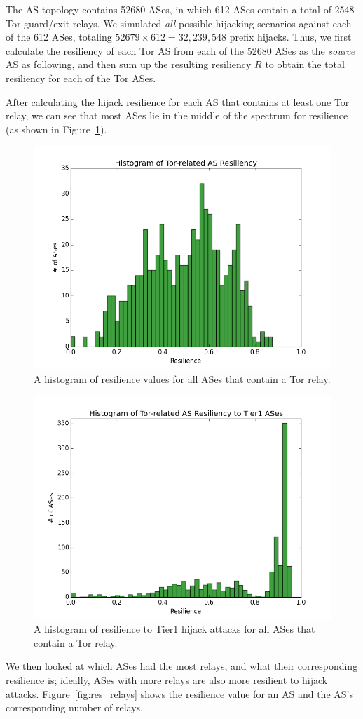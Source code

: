 The AS topology contains 52680 ASes, in which 612 ASes contain a total of 2548 Tor guard/exit relays. We simulated \emph{all} possible hijacking scenarios against each of the 612 ASes, totaling $52679 \times 612 = 32,239,548$ prefix hijacks. Thus, we first calculate the resiliency of each Tor AS from each of the 52680 ASes as the \emph{source} AS as following, and then sum up the resulting resiliency $R$ to obtain the total resiliency for each of the Tor ASes. 

After calculating the hijack resilience for each AS that contains at least one Tor relay, we can see that most ASes lie in the middle of the spectrum for resilience (as shown in Figure~\ref{fig:resilience_histogram}).

\begin{figure}
\centering
\includegraphics[width=.4\textwidth]{resilience_histogram}
\caption{A histogram of resilience values for all ASes that contain a Tor relay.}
\label{fig:resilience_histogram}
\end{figure}

\begin{figure}
\centering
\includegraphics[width=.4\textwidth]{hijack_tier1}
\caption{A histogram of resilience to Tier1 hijack attacks for all ASes that contain a Tor relay.}
\label{fig:resilience_histogram_tier1}
\end{figure}

We then looked at which ASes had the most relays, and what their corresponding resilience is; ideally, ASes with more relays are also more resilient to hijack attacks.  Figure~\ref{fig:res_relays} shows the resilience value for an AS and the AS's corresponding number of relays.  

